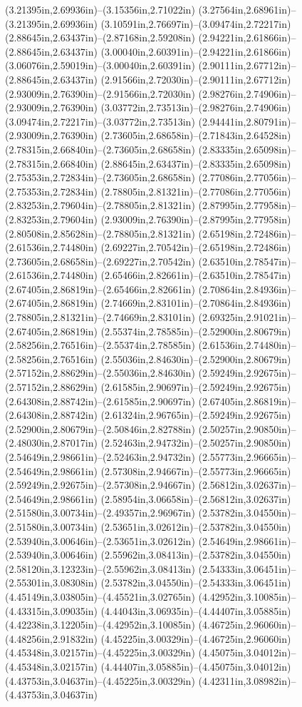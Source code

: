 (3.21395in,2.69936in)--(3.15356in,2.71022in) (3.27564in,2.68961in)--(3.21395in,2.69936in) (3.10591in,2.76697in)--(3.09474in,2.72217in) (2.88645in,2.63437in)--(2.87168in,2.59208in) (2.94221in,2.61866in)--(2.88645in,2.63437in) (3.00040in,2.60391in)--(2.94221in,2.61866in) (3.06076in,2.59019in)--(3.00040in,2.60391in) (2.90111in,2.67712in)--(2.88645in,2.63437in) (2.91566in,2.72030in)--(2.90111in,2.67712in) (2.93009in,2.76390in)--(2.91566in,2.72030in) (2.98276in,2.74906in)--(2.93009in,2.76390in) (3.03772in,2.73513in)--(2.98276in,2.74906in) (3.09474in,2.72217in)--(3.03772in,2.73513in) (2.94441in,2.80791in)--(2.93009in,2.76390in) (2.73605in,2.68658in)--(2.71843in,2.64528in) (2.78315in,2.66840in)--(2.73605in,2.68658in) (2.83335in,2.65098in)--(2.78315in,2.66840in) (2.88645in,2.63437in)--(2.83335in,2.65098in) (2.75353in,2.72834in)--(2.73605in,2.68658in) (2.77086in,2.77056in)--(2.75353in,2.72834in) (2.78805in,2.81321in)--(2.77086in,2.77056in) (2.83253in,2.79604in)--(2.78805in,2.81321in) (2.87995in,2.77958in)--(2.83253in,2.79604in) (2.93009in,2.76390in)--(2.87995in,2.77958in) (2.80508in,2.85628in)--(2.78805in,2.81321in) (2.65198in,2.72486in)--(2.61536in,2.74480in) (2.69227in,2.70542in)--(2.65198in,2.72486in) (2.73605in,2.68658in)--(2.69227in,2.70542in) (2.63510in,2.78547in)--(2.61536in,2.74480in) (2.65466in,2.82661in)--(2.63510in,2.78547in) (2.67405in,2.86819in)--(2.65466in,2.82661in) (2.70864in,2.84936in)--(2.67405in,2.86819in) (2.74669in,2.83101in)--(2.70864in,2.84936in) (2.78805in,2.81321in)--(2.74669in,2.83101in) (2.69325in,2.91021in)--(2.67405in,2.86819in) (2.55374in,2.78585in)--(2.52900in,2.80679in) (2.58256in,2.76516in)--(2.55374in,2.78585in) (2.61536in,2.74480in)--(2.58256in,2.76516in) (2.55036in,2.84630in)--(2.52900in,2.80679in) (2.57152in,2.88629in)--(2.55036in,2.84630in) (2.59249in,2.92675in)--(2.57152in,2.88629in) (2.61585in,2.90697in)--(2.59249in,2.92675in) (2.64308in,2.88742in)--(2.61585in,2.90697in) (2.67405in,2.86819in)--(2.64308in,2.88742in) (2.61324in,2.96765in)--(2.59249in,2.92675in) (2.52900in,2.80679in)--(2.50846in,2.82788in) (2.50257in,2.90850in)--(2.48030in,2.87017in) (2.52463in,2.94732in)--(2.50257in,2.90850in) (2.54649in,2.98661in)--(2.52463in,2.94732in) (2.55773in,2.96665in)--(2.54649in,2.98661in) (2.57308in,2.94667in)--(2.55773in,2.96665in) (2.59249in,2.92675in)--(2.57308in,2.94667in) (2.56812in,3.02637in)--(2.54649in,2.98661in) (2.58954in,3.06658in)--(2.56812in,3.02637in) (2.51580in,3.00734in)--(2.49357in,2.96967in) (2.53782in,3.04550in)--(2.51580in,3.00734in) (2.53651in,3.02612in)--(2.53782in,3.04550in) (2.53940in,3.00646in)--(2.53651in,3.02612in) (2.54649in,2.98661in)--(2.53940in,3.00646in) (2.55962in,3.08413in)--(2.53782in,3.04550in) (2.58120in,3.12323in)--(2.55962in,3.08413in) (2.54333in,3.06451in)--(2.55301in,3.08308in) (2.53782in,3.04550in)--(2.54333in,3.06451in) (4.45149in,3.03805in)--(4.45521in,3.02765in) (4.42952in,3.10085in)--(4.43315in,3.09035in) (4.44043in,3.06935in)--(4.44407in,3.05885in) (4.42238in,3.12205in)--(4.42952in,3.10085in) (4.46725in,2.96060in)--(4.48256in,2.91832in) (4.45225in,3.00329in)--(4.46725in,2.96060in) (4.45348in,3.02157in)--(4.45225in,3.00329in) (4.45075in,3.04012in)--(4.45348in,3.02157in) (4.44407in,3.05885in)--(4.45075in,3.04012in) (4.43753in,3.04637in)--(4.45225in,3.00329in) (4.42311in,3.08982in)--(4.43753in,3.04637in) 